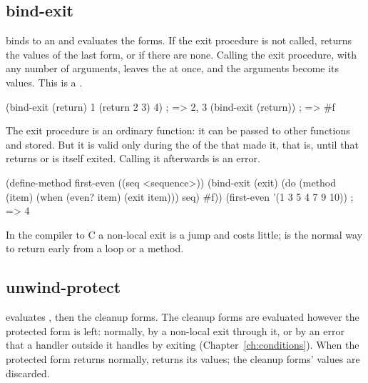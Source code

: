 \subsection{bind-exit}

\begin{quote}
\end{quote}

\noindent {} binds  to an  and evaluates the forms. If the exit procedure is not called,
 returns the values of the last form, or  if
there are none. Calling the exit procedure, with any number of arguments,
leaves the  at once, and the arguments become its values.
This is a .

\begin{dylan}
(bind-exit (return)
  1
  (return 2 3)
  4)                     ; => 2, 3
(bind-exit (return))     ; => #f
\end{dylan}

\noindent The exit procedure is an ordinary function: it can be passed to
other functions and stored. But it is valid only during the
 of the  that made it, that is, until
that  returns or is itself exited. Calling it afterwards is
an error.

\begin{dylan}
(define-method first-even ((seq <sequence>))
  (bind-exit (exit)
    (do (method (item)
          (when (even? item)
            (exit item)))
        seq)
    #f))
(first-even '(1 3 5 4 7 9 10))   ; => 4
\end{dylan}

\noindent In the compiler to C a non-local exit is a jump and costs little;
 is the normal way to return early from a loop or a method.

\subsection{unwind-protect}

\begin{quote}
\end{quote}

\noindent {} evaluates , then the
cleanup forms. The cleanup forms are evaluated however the protected form
is left: normally, by a non-local exit through it, or by an error that a
handler outside it handles by exiting (Chapter~\ref{ch:conditions}). When the
protected form returns normally,  returns its values;
the cleanup forms' values are discarded.

